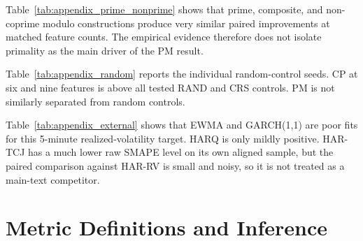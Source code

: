 ﻿\documentclass[a4paper]{article}
\begin{document}
\clearpage

{\renewcommand{\thetable}{C3}
\begin{center}
\label{tab:appendix_prime_nonprime}
\scriptsize
\renewcommand{\arraystretch}{1.08}
\resizebox{0.84\textwidth}{!}{}
\end{center}}

\noindent
Table~\ref{tab:appendix_prime_nonprime} shows that prime, composite, and non-coprime modulo constructions produce very similar paired improvements at matched feature counts. The empirical evidence therefore does not isolate primality as the main driver of the PM result.

\clearpage

{\renewcommand{\thetable}{C4}
\begin{center}
\label{tab:appendix_random}
\scriptsize
\renewcommand{\arraystretch}{1.08}
\resizebox{0.88\textwidth}{!}{}
\end{center}}

\noindent
Table~\ref{tab:appendix_random} reports the individual random-control seeds. CP at six and nine features is above all tested RAND and CRS controls. PM is not similarly separated from random controls.

{\renewcommand{\thetable}{C5}
\begin{center}
\label{tab:appendix_external}
\scriptsize
\renewcommand{\arraystretch}{1.08}
\resizebox{0.62\textwidth}{!}{}
\end{center}}

\noindent
Table~\ref{tab:appendix_external} shows that EWMA and GARCH(1,1) are poor fits for this 5-minute realized-volatility target. HARQ is only mildly positive. HAR-TCJ has a much lower raw SMAPE level on its own aligned sample, but the paired comparison against HAR-RV is small and noisy, so it is not treated as a main-text competitor.

\clearpage

\section{Metric Definitions and Inference}
\end{document}
